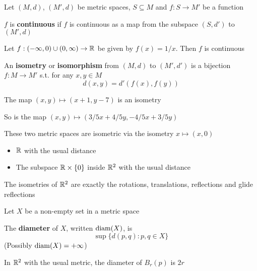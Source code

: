 \documentclass[11pt]{article}
\begin{document}
Let \((M,d)\), \((M',d)\) be metric spaces, \(S\subseteq M\) and \(f:S\to M'\) be a function

\begin{definition}[]
\(f\)  is \textbf{continuous} if \(f\) is continuous as a map from the subspace \((S,d')\) to \((M',d)\)
\end{definition}

\begin{examplle}[in \(\R\)]
Let \(f:(-\infty,0)\cup(0,\infty)\to\mathbb{R}\)  be given by \(f(x)=1/x\). Then \(f\) is continuous
\end{examplle}

\begin{definition}[]
An \textbf{isometry} or \textbf{isomorphism} from \((M,d)\) to \((M',d')\) is a bijection \(f:M\to M'\) s.t. for
any \(x,y\in M\)
\begin{equation*}
d(x,y)=d'(f(x),f(y))
\end{equation*}
\end{definition}

\begin{examplle}[in \(\R^2\)]
The map \((x,y)\mapsto(x+1,y-7)\) is an isometry

So is the map \((x,y)\mapsto(3/5x+4/5y,-4/5x+3/5y)\)

These two metric spaces are isometric via the isometry \(x\mapsto(x,0)\)
\begin{itemize}
\item \(\R\) with the usual distance
\item The subspace \(\mathbb{R}\times\{0\}\) inside \(\R^2\) with the usual distance
\end{itemize}
\end{examplle}

\begin{proposition}[]
The isometries of \(\R^2\) are exactly the rotations, translations, reflections and glide reflections
\end{proposition}

Let \(X\) be a non-empty set in a metric space

\begin{definition}[]
The \textbf{diameter} of \(X\), written \(\operatorname{diam}(X)\), is
\begin{equation*}
\sup\{d(p,q):p,q\in X\}
\end{equation*}
(Possibly \(\operatorname{diam}(X)=+\infty\))
\end{definition}

\begin{examplle}[]
In \(\R^2\) with the usual metric, the diameter of \(B_r(p)\) is \(2r\)
\end{examplle}
\end{document}

